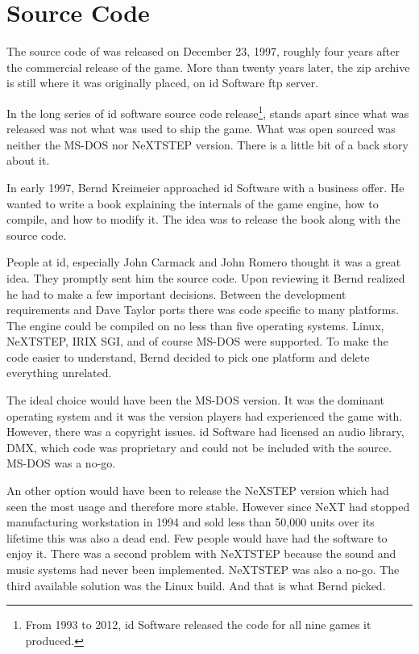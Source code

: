 \section{Source Code}
The source code of \doom was released on December 23, 1997, roughly four years after the commercial release of the game. More than twenty years later, the zip archive is still where it was originally placed, on id Software ftp server.\\
\par
{}
\par
 In the long series of id software source code release\footnote{From 1993 to 2012, id Software released the code for all nine games it produced.}, \doom stands apart since what was released was not what was used to ship the game. What was open sourced was neither the MS-DOS nor NeXTSTEP version. There is a little bit of a back story about it.\\
 \par
 In early 1997, Bernd Kreimeier approached id Software with a business offer. He wanted to write a book explaining the internals of the game engine, how to compile, and how to modify it. The idea was to release the book along with the source code.\\
 \par
  People at id, especially John Carmack and John Romero thought it was a great idea. They promptly sent him the source code. Upon reviewing it Bernd realized he had to make a few important decisions. Between the development requirements and Dave Taylor ports there was code specific to many platforms. The engine could be compiled on no less than five operating systems. Linux, NeXTSTEP, IRIX SGI, and of course MS-DOS were supported. To make the code easier to understand, Bernd decided to pick one platform and delete everything unrelated.\\
  \par
  The ideal choice would have been the MS-DOS version. It was the dominant operating system and it was the version players had experienced the game with. However, there was a copyright issues. id Software had licensed an audio library, DMX, which code was proprietary and could not be included with the source. MS-DOS was a no-go.\\
  \par
   An other option would have been to release the NeXSTEP version which had seen the most usage and therefore more stable. However since NeXT had stopped manufacturing workstation in 1994 and sold less than 50,000 units over its lifetime this was also a dead end. Few people would have had the software to enjoy it. There was a second problem with NeXTSTEP because the sound and music systems had never been implemented. NeXTSTEP was also a no-go. The third available solution was the Linux build. And that is what Bernd picked.\\
